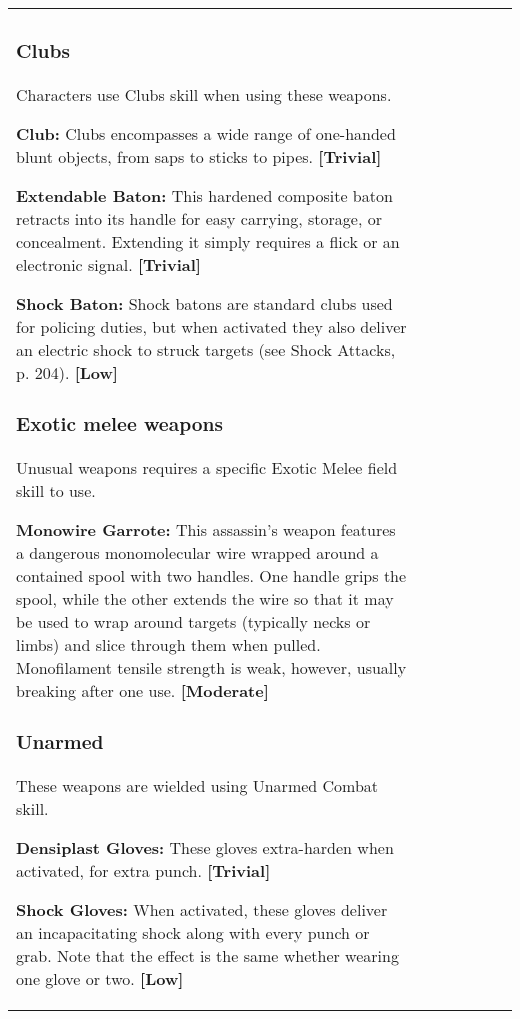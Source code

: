 \begin{tabular}{|l|l|l|l|l|l|l|}
\subsubsection{Clubs} 

Characters use Clubs skill when using these weapons. 

\textbf{Club:} Clubs encompasses a wide range of one-handed blunt objects, from saps to sticks to pipes. \textbf{[Trivial]} 

\textbf{Extendable Baton:} This hardened composite baton retracts into its handle for easy carrying, storage, or concealment. Extending it simply requires a flick or an electronic signal. \textbf{[Trivial]} 

\textbf{Shock Baton:} Shock batons are standard clubs used for policing duties, but when activated they also deliver an electric shock to struck targets (see Shock Attacks, p. 204). \textbf{[Low]} 

\subsubsection{Exotic melee weapons} 

Unusual weapons requires a specific Exotic Melee field skill to use. 

\textbf{Monowire Garrote:} This assassin’s weapon features a dangerous monomolecular wire wrapped around a contained spool with two handles. One handle grips the spool, while the other extends the wire so that it may be used to wrap around targets (typically necks or limbs) and slice through them when pulled. Monofilament tensile strength is weak, however, usually breaking after one use. \textbf{[Moderate]} 

\subsubsection{Unarmed} 

These weapons are wielded using Unarmed Combat skill. 

\textbf{Densiplast Gloves:} These gloves extra-harden when activated, for extra punch. \textbf{[Trivial]} 

\textbf{Shock Gloves:} When activated, these gloves deliver an incapacitating shock along with every punch or grab. Note that the effect is the same whether wearing one glove or two. \textbf{[Low]} 








\end{tabular}

